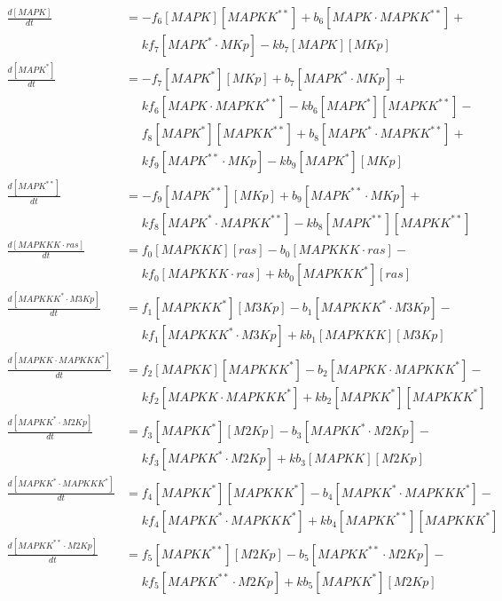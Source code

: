 \begin{equation*}
\begin{align*}
    \frac{d[MAPK]}{dt} &= -f_{6}[MAPK][MAPKK^{**}] + b_{6}[MAPK\cdot{}MAPKK^{**}] +\\
    &\phantom{=} kf_{7}[MAPK^{*}\cdot{}MKp] - kb_{7}[MAPK][MKp]\\ 
    \frac{d[MAPK^{*}]}{dt} &= -f_{7}[MAPK^{*}][MKp] + b_{7}[MAPK^{*}\cdot{}MKp] +\\
    &\phantom{=} kf_{6}[MAPK\cdot{}MAPKK^{**}] - kb_{6}[MAPK^{*}][MAPKK^{**}] -\\
    &\phantom{=} f_{8}[MAPK^{*}][MAPKK^{**}] + b_{8}[MAPK^{*}\cdot{}MAPKK^{**}] +\\
    &\phantom{=} kf_{9}[MAPK^{**}\cdot{}MKp] - kb_{9}[MAPK^{*}][MKp]\\
    \frac{d[MAPK^{**}]}{dt} &= -f_{9}[MAPK^{**}][MKp] + b_{9}[MAPK^{**}\cdot{}MKp] +\\
    &\phantom{=} kf_{8}[MAPK^{*}\cdot{}MAPKK^{**}] - kb_{8}[MAPK^{**}][MAPKK^{**}]\\
    \frac{d[MAPKKK\cdot{}ras]}{dt} &= f_{0}[MAPKKK][ras] - b_{0}[MAPKKK\cdot{}ras] -\\
    &\phantom{=} kf_{0}[MAPKKK\cdot{}ras] + kb_{0}[MAPKKK^{*}][ras]\\
    \frac{d[MAPKKK^{*}\cdot{}M3Kp]}{dt} &= f_{1}[MAPKKK^{*}][M3Kp] - b_{1}[MAPKKK^{*}\cdot{}M3Kp] -\\
    &\phantom{=} kf_{1}[MAPKKK^{*}\cdot{}M3Kp] + kb_{1}[MAPKKK][M3Kp]\\
    \frac{d[MAPKK\cdot{}MAPKKK^{*}]}{dt} &= f_{2}[MAPKK][MAPKKK^{*}] - b_{2}[MAPKK\cdot{}MAPKKK^{*}] -\\
    &\phantom{=} kf_{2}[MAPKK\cdot{}MAPKKK^{*}] + kb_{2}[MAPKK^{*}][MAPKKK^{*}]\\
    \frac{d[MAPKK^{*}\cdot{}M2Kp]}{dt} &= f_{3}[MAPKK^{*}][M2Kp] - b_{3}[MAPKK^{*}\cdot{}M2Kp] -\\
    &\phantom{=} kf_{3}[MAPKK^{*}\cdot{}M2Kp] + kb_{3}[MAPKK][M2Kp]\\
    \frac{d[MAPKK^{*}\cdot{}MAPKKK^{*}]}{dt} &= f_{4}[MAPKK^{*}][MAPKKK^{*}] - b_{4}[MAPKK^{*}\cdot{}MAPKKK^{*}] -\\
    &\phantom{=} kf_{4}[MAPKK^{*}\cdot{}MAPKKK^{*}] + kb_{4}[MAPKK^{**}][MAPKKK^{*}]\\
    \frac{d[MAPKK^{**}\cdot{}M2Kp]}{dt} &= f_{5}[MAPKK^{**}][M2Kp] - b_{5}[MAPKK^{**}\cdot{}M2Kp] -\\
    &\phantom{=} kf_{5}[MAPKK^{**}\cdot{}M2Kp] + kb_{5}[MAPKK^{*}][M2Kp]\\

\end{align*}
\end{equation*}
